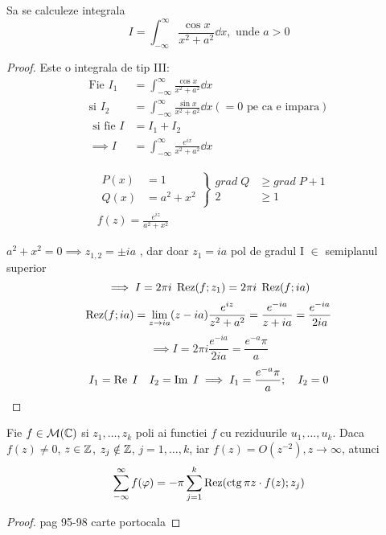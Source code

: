 \begin{aplicatie}
    Sa se calculeze integrala
    \[
        I = \int_{-\infty}^{\infty} \frac{\cos x}{x^2+a^2} \dd x, \text{ unde } a>0
    \]
    \begin{proof}
        Este o integrala de tip III:
        \begin{align*}
            \text{Fie } I_1 &= \int_{-\infty}^{\infty} \frac{\cos x}{x^2+a^2} \dd x \\
            \text{si }  I_2 &= \int_{-\infty}^{\infty} \frac{\sin x}{x^2+a^2} \dd x (= 0 \text{ pe ca e impara}) \\
            \text{ si fie } I &= I_1+I_2 \\
            \implies I &= \int_{-\infty}^{\infty} \frac{e^{ix}}{x^2+a^2} \dd x
        \end{align*}

        \begin{align*}
            &\left .
                \begin{aligned}
                    P(x) &= 1 \\
                    Q(x) &= a^2 +x^2
                \end{aligned}
            \right \}
            \begin{aligned}
                grad\; Q &\geq grad\; P+1 \\
                2 &\geq 1
            \end{aligned}
            \\
            &f(z) = \frac{e^{iz}}{a^2 +x^2}
        \end{align*}

        $a^2 +x^2 = 0 \implies z_{1,2} = \pm i a$ , dar doar $z_1 = i a$
        pol de gradul I $\in$ semiplanul superior
        \[
            \implies I = 2 \pi i\; \operatorname{Rez}(f;z_1) = 2 \pi i\; \operatorname{Rez}(f;i a)
        \]
        \[
            \operatorname{Rez}(f;i a) = \lim_{z \to ia} (z - i a) \frac{e^{iz}}{z^2+a^2}
                = \frac{e^{-ia}}{z + i a} = \frac{e^{-ia}}{2ia}
        \]
        \[
            \implies I = 2 \pi i \frac{e^{-ia}}{2ia} = \frac{e^{-a}\pi}{a}
        \]
        \[
            I_1 = \operatorname{Re} \; I \quad I_2=\operatorname{Im} \; I
                \implies I_1 = \frac{e^{-a}\pi}{a}; \quad I_2 = 0
        \]
    \end{proof}
\end{aplicatie}

\begin{theorem}
    Fie $f \in \mathcal{M}(\mathbb{C})$ si $z_1 , \dotsc , z_k$ poli ai functiei $f$ cu
    reziduurile $u_1, \dotsc , u_k$.
    Daca $f(z) \neq 0$, $z \in \mathbb{Z}$, $z_j \notin \mathbb{Z}$, $j=1, \dotsc, k$,
    iar $f(z) = O(z^{-2}), z\to \infty$, atunci
    \[
        \sum_{-\infty}^{\infty} f(\varphi) = -\pi \sum_{j=1}^{k} \operatorname{Rez} ( \operatorname{ctg} \pi z \cdot f(z);z_j )
    \]
    \begin{proof}
        pag 95-98 carte portocala
    \end{proof}
\end{theorem}

